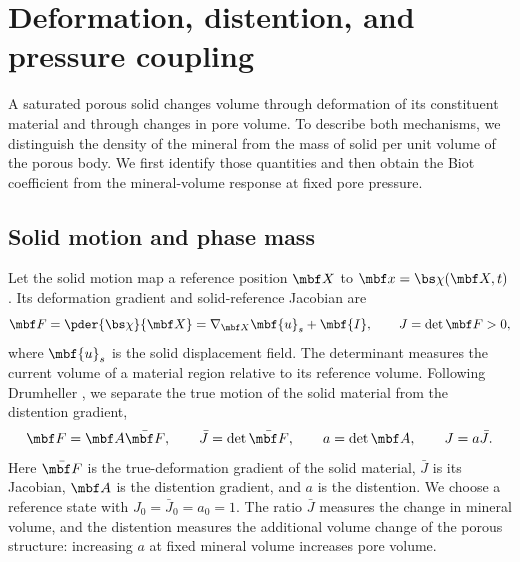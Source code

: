 \section{Deformation, distention, and pressure coupling}
\label{sec:finite-deformation-biot}

A saturated porous solid changes volume through deformation of its constituent
material and through changes in pore volume.  To describe both mechanisms,
we distinguish the density of the mineral from the mass of solid per unit
volume of the porous body.  We first identify those quantities and then obtain the Biot coefficient from the mineral-volume
response at fixed pore pressure.

\subsection{Solid motion and phase mass}
\label{sec:solved-solid-state}

Let the solid motion map a reference position \(\mbf X\) to
\(\mbf x=\bs\chi(\mbf X,t)\).  Its deformation gradient and solid-reference
Jacobian are
\begin{equation*}
 \mbf F=\pder{\bs\chi}{\mbf X} = \nabla_{\mbf X} \mbf{u}_s + \mbf{I},
 \qquad J=\det\mbf F>0,
\end{equation*}
where $\mbf{u}_s$ is the solid displacement field.  The determinant measures
the current volume of a material region relative to its reference volume.
Following Drumheller \citep[Sec.~3]{drumheller2000}, we separate the true
motion of the solid material from the distention gradient,
\begin{equation*}
 \mbf F=\mbf A\bar{\mbf F},
 \qquad \bar J=\det\bar{\mbf F},
 \qquad a=\det\mbf A,
 \qquad J=a\bar J.
\end{equation*}
Here \(\bar{\mbf F}\) is the true-deformation gradient of the solid
material, \(\bar J\) is its Jacobian, \(\mbf A\) is the distention
gradient, and \(a\) is the distention.  We choose a reference state with
\(J_0=\bar J_0=a_0=1\).  The ratio \(\bar J\) measures the change in
mineral volume, and the distention measures the additional volume change of
the porous structure: increasing \(a\) at fixed mineral volume increases
pore volume.

